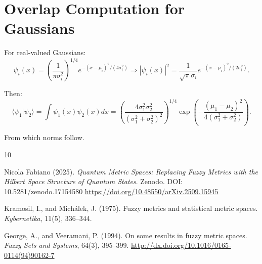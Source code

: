 \documentclass{article}
\begin{document}
\appendix
\section{Overlap Computation for Gaussians}

For real-valued Gaussians:
$$
\psi_i(x) = \left(\frac{1}{\pi \sigma_i^2}\right)^{1/4} e^{-(x-\mu_i)^2/(4\sigma_i^2)}
\Rightarrow |\psi_i(x)|^2 = \frac{1}{\sqrt{\pi}\sigma_i} e^{-(x-\mu_i)^2/(2\sigma_i^2)} .
$$

Then:
$$
\langle \psi_1 | \psi_2 \rangle = \int \psi_1(x)\psi_2(x) dx = \left( \frac{4\sigma_1^2\sigma_2^2}{(\sigma_1^2 + \sigma_2^2)^2} \right)^{1/4} \exp\left( -\frac{(\mu_1 - \mu_2)^2}{4(\sigma_1^2 + \sigma_2^2)} \right) .
$$

From which norms follow.

\begin{thebibliography}{10}

Nicola Fabiano (2025). \emph{Quantum Metric Spaces: Replacing Fuzzy Metrics with the Hilbert Space Structure of Quantum States}. Zenodo. DOI: 10.5281/zenodo.17154580
\url{https://doi.org/10.48550/arXiv.2509.15945}



Kramosil, I., and Mich\'alek, J. (1975). Fuzzy metrics and statistical metric spaces. \emph{Kybernetika}, 11(5), 336–344.


George, A., and Veeramani, P. (1994). On some results in fuzzy metric spaces. \emph{Fuzzy Sets and Systems}, 64(3), 395–399.
\url{http://dx.doi.org/10.1016/0165-0114(94)90162-7}

\end{thebibliography}
\end{document}
